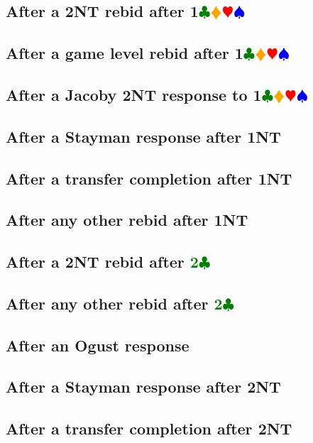 \documentclass{article}
\newcommand{\Hs}{\textcolor{Red}{$\varheart$}}
\newcommand{\Ss}{\textcolor{Blue}{$\spadesuit$}}
\newcommand{\Ds}{\textcolor{Orange}{$\vardiamond$}}
\newcommand{\Cs}{\textcolor{Green}{$\clubsuit$}}
\newcommand{\NTs}{\textbf{\footnotesize{NT}}}
\newcommand{\C}[1]{\textcolor{Green}{\textbf{#1}\Cs}}
\newcommand{\NT}[1]{\textbf{#1\NTs}}
\newcommand{\suits}[1]{\textbf{#1}\Cs\Ds\Hs\Ss}
\begin{document}
\subsection{After a \NT{2} rebid after \suits{1}}

\subsection{After a game level rebid after \suits{1}}

\subsection{After a Jacoby \NT{2} response to \suits{1}}

\subsection{After a Stayman response after \NT{1}}

\subsection{After a transfer completion after \NT{1}}

\subsection{After any other rebid after \NT{1}}

\subsection{After a \NT{2} rebid after \C{2}}

\subsection{After any other rebid after \C{2}}

\subsection{After an Ogust response}

\subsection{After a Stayman response after \NT{2}}

\subsection{After a transfer completion after \NT{2}}
\end{document}
